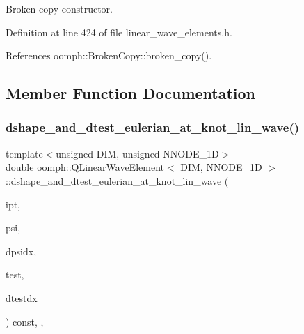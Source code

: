 Broken copy constructor. 



Definition at line 424 of file linear\+\_\+wave\+\_\+elements.\+h.



References oomph\+::\+Broken\+Copy\+::broken\+\_\+copy().



\subsection{Member Function Documentation}
\mbox{\label{classoomph_1_1QLinearWaveElement_a96e8d0a3deace8fe691b5576607f1c0c}} 
\subsubsection{\texorpdfstring{dshape\+\_\+and\+\_\+dtest\+\_\+eulerian\+\_\+at\+\_\+knot\+\_\+lin\+\_\+wave()}{dshape\_and\_dtest\_eulerian\_at\_knot\_lin\_wave()}}
{\footnotesize\ttfamily template$<$unsigned D\+IM, unsigned N\+N\+O\+D\+E\+\_\+1D$>$ \\
double \hyperlink{classoomph_1_1QLinearWaveElement}{oomph\+::\+Q\+Linear\+Wave\+Element}$<$ D\+IM, N\+N\+O\+D\+E\+\_\+1D $>$\+::dshape\+\_\+and\+\_\+dtest\+\_\+eulerian\+\_\+at\+\_\+knot\+\_\+lin\+\_\+wave (\begin{DoxyParamCaption}\item[{const unsigned \&}]{ipt,  }\item[{\hyperlink{classoomph_1_1Shape}{Shape} \&}]{psi,  }\item[{\hyperlink{classoomph_1_1DShape}{D\+Shape} \&}]{dpsidx,  }\item[{\hyperlink{classoomph_1_1Shape}{Shape} \&}]{test,  }\item[{\hyperlink{classoomph_1_1DShape}{D\+Shape} \&}]{dtestdx }\end{DoxyParamCaption}) const\hspace{0.3cm}{\ttfamily [inline]}, {\ttfamily [protected]}, {\ttfamily [virtual]}}




